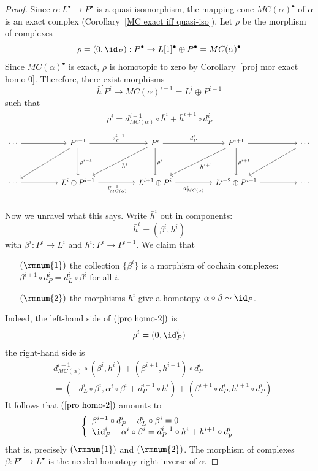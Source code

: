 \begin{proof}
Since $\alpha:L^\bullet\to P^\bullet$ is a quasi-isomorphism, the mapping cone $MC(\alpha)^\bullet$ of $\alpha$ is an exact complex (Corollary~\ref{MC exact iff quasi-iso}). Let $\rho$ be the morphism of complexes
\[\rho=(0,\id_P):P^\bullet\to L[1]^\bullet\oplus P^\bullet=MC(\alpha)^\bullet\]
Since $MC(\alpha)^\bullet$ is exact, $\rho$ is homotopic to zero by Corollary~\ref{proj mor exact homo 0}. Therefore, there exist morphisms
\[\bar{h}^:P^i\to MC(\alpha)^{i-1}=L^i\oplus P^{i-1}\]
such that
\begin{align}\label{pro homo-2}
\rho^i=d_{MC(\alpha)}^{i-1}\circ\bar{h}^i+\bar{h}^{i+1}\circ d_P^i
\end{align}
\[\begin{tikzcd}
\cdots\ar[rr]&&P^{i-1}\ar[dd,"\rho^{i-1}"]\ar[lldd]\ar[rr,"d_P^{i-1}"]&&P^i\ar[dd,"\rho^i"]\ar[lldd,"\bar{h}^i"]\ar[rr,"d_P^i"]&&P^{i+1}\ar[dd,"\rho^{i+1}"]\ar[lldd,"\bar{h}^{i+1}"]\ar[rr]&&\cdots\ar[lldd]\\
&&&&&&&&\\
\cdots\ar[rr]&&L^i\oplus P^{i-1}\ar[rr,swap,"d_{MC(\alpha)}^{i-1}"]&&L^{i+1}\oplus P^i\ar[rr,swap,"d_{MC(\alpha)}^i"]&&L^{i+2}\oplus P^{i+1}\ar[rr]&&\cdots\\
\end{tikzcd}\]
Now we unravel what this says. Write $\bar{h}^i$ out in components:
\[\bar{h}^i=(\beta^i,h^i)\]
with $\beta^i:P^i\to L^i$ and $h^i:P^i\to P^{i-1}$. We claim that
\begin{itemize}
\item[$(\rmnum{1})$]the collection $\{\beta^i\}$ is a morphism of cochain complexes: $\beta^{i+1}\circ d^i_P=d^i_L\circ\beta^i$ for all $i$.
\item[$(\rmnum{2})$]the morphisms $h^i$ give a homotopy $\alpha\circ\beta\sim \id_P$.
\end{itemize}
Indeed, the left-hand side of $(\ref{pro homo-2})$ is
\[\rho^i=(0,\id_P^i)\]
the right-hand side is
\begin{align*}
&d^{i-1}_{MC(\alpha)}\circ(\beta^i,h^i)+(\beta^{i+1},h^{i+1})\circ d^i_P\\
&=(-d^i_L\circ\beta^i,\alpha^i\circ\beta^i+d_P^{i-1}\circ h^i)+(\beta^{i+1}\circ d_P^i,h^{i+1}\circ d_P^i)
\end{align*}
It follows that $(\ref{pro homo-2})$ amounts to
\[\left\{\begin{array}{l}
\beta^{i+1}\circ d_P^i-d_L^i\circ\beta^i=0\\
\id_P^i-\alpha^i\circ\beta^i=d_P^{i-1}\circ h^i+h^{i+1}\circ d_p^i
\end{array}\right. \]
that is, precisely $(\rmnum{1})$ and $(\rmnum{2})$.
The morphism of complexes $\beta:P^\bullet\to L^\bullet$ is the needed homotopy right-inverse of $\alpha$.
\end{proof}
